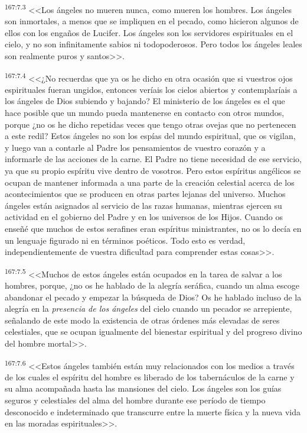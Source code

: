 \par 
\textsuperscript{167:7.3} <<Los ángeles no mueren nunca, como mueren los hombres. Los ángeles son inmortales, a menos que se impliquen en el pecado, como hicieron algunos de ellos con los engaños de Lucifer. Los ángeles son los servidores espirituales en el cielo, y no son infinitamente sabios ni todopoderosos. Pero todos los ángeles leales son realmente puros y santos>>.

\par 
\textsuperscript{167:7.4} <<¿No recuerdas que ya os he dicho en otra ocasión que si vuestros ojos espirituales fueran ungidos, entonces veríais los cielos abiertos y contemplaríais a los ángeles de Dios subiendo y bajando? El ministerio de los ángeles es el que hace posible que un mundo pueda mantenerse en contacto con otros mundos, porque ¿no os he dicho repetidas veces que tengo otras ovejas que no pertenecen a este redil? Estos ángeles no son los espías del mundo espiritual, que os vigilan, y luego van a contarle al Padre los pensamientos de vuestro corazón y a informarle de las acciones de la carne. El Padre no tiene necesidad de ese servicio, ya que su propio espíritu vive dentro de vosotros. Pero estos espíritus angélicos se ocupan de mantener informada a una parte de la creación celestial acerca de los acontecimientos que se producen en otras partes lejanas del universo. Muchos ángeles están asignados al servicio de las razas humanas, mientras ejercen su actividad en el gobierno del Padre y en los universos de los Hijos. Cuando os enseñé que muchos de estos serafines eran espíritus ministrantes, no os lo decía en un lenguaje figurado ni en términos poéticos. Todo esto es verdad, independientemente de vuestra dificultad para comprender estas cosas>>.

\par 
\textsuperscript{167:7.5} <<Muchos de estos ángeles están ocupados en la tarea de salvar a los hombres, porque, ¿no os he hablado de la alegría seráfica, cuando un alma escoge abandonar el pecado y empezar la búsqueda de Dios? Os he hablado incluso de la alegría en la \textit{presencia de los ángeles} del cielo cuando un pecador se arrepiente, señalando de este modo la existencia de otras órdenes más elevadas de seres celestiales, que se ocupan igualmente del bienestar espiritual y del progreso divino del hombre mortal>>.

\par 
\textsuperscript{167:7.6} <<Estos ángeles también están muy relacionados con los medios a través de los cuales el espíritu del hombre es liberado de los tabernáculos de la carne y su alma acompañada hasta las mansiones del cielo. Los ángeles son los guías seguros y celestiales del alma del hombre durante ese período de tiempo desconocido e indeterminado que transcurre entre la muerte física y la nueva vida en las moradas espirituales>>.

